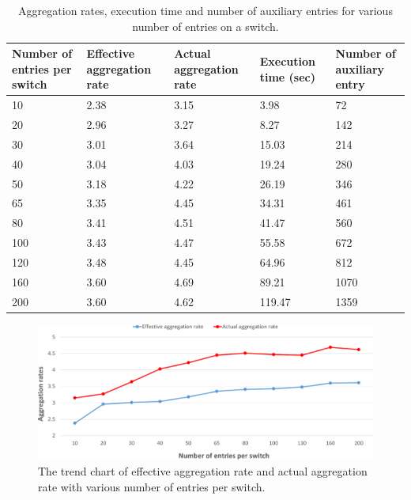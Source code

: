 \documentclass[conference]{IEEEtran}
\begin{document}
\begin{table}
\centering
\caption{Aggregation rates, execution time and number of auxiliary entries for various number of entries on a switch.}
\begin{tabular}{|p{1.8cm}|p{2.6cm}|p{2.6cm}|p{1.9cm}|p{2.8cm}|}
\hline Number of entries per switch & Effective aggregation rate & Actual aggregation rate & Execution time (sec) & Number of auxiliary entry \\
\hline
\hline 10 & 2.38 & 3.15 & 3.98 & 72 \\
\hline 20 & 2.96 & 3.27 & 8.27 & 142 \\
\hline 30 & 3.01 & 3.64 & 15.03 & 214 \\
\hline 40 & 3.04 & 4.03 & 19.24 & 280 \\
\hline 50 & 3.18 & 4.22 & 26.19 & 346 \\
\hline 65 & 3.35 & 4.45 & 34.31 & 461 \\
\hline 80 & 3.41 & 4.51 & 41.47 & 560 \\
\hline 100 & 3.43 & 4.47 & 55.58 & 672 \\
\hline 120 & 3.48 & 4.45 & 64.96 & 812 \\
\hline 160 & 3.60 & 4.69 & 89.21 & 1070 \\
\hline 200 & 3.60 & 4.62 & 119.47 & 1359 \\
\hline 
\end{tabular}
\label{table:different_entry_per_switch}
\end{table}

\begin{figure}[ht]
\centering
\includegraphics[width=1\linewidth]{figures/exp_entrynum_trend.pdf}
\caption{The trend chart of effective aggregation rate and actual aggregation rate with various number of entries per switch.}
\label{exp_entrynum_trend}
\end{figure}
\end{document}
